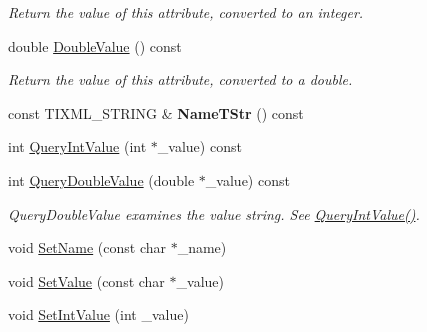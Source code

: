 \begin{DoxyCompactItemize}
\begin{DoxyCompactList}\small\item\em \-Return the value of this attribute, converted to an integer. \end{DoxyCompactList}\item 
\hypertarget{class_ti_xml_attribute_a2880ddef53fc7522c99535273954d230}{
double \hyperlink{class_ti_xml_attribute_a2880ddef53fc7522c99535273954d230}{\-Double\-Value} () const }
\label{class_ti_xml_attribute_a2880ddef53fc7522c99535273954d230}

\begin{DoxyCompactList}\small\item\em \-Return the value of this attribute, converted to a double. \end{DoxyCompactList}\item 
\hypertarget{class_ti_xml_attribute_a64cee17bceb8232eb0736d26dd082d79}{
const \-T\-I\-X\-M\-L\-\_\-\-S\-T\-R\-I\-N\-G \& {\bfseries \-Name\-T\-Str} () const }
\label{class_ti_xml_attribute_a64cee17bceb8232eb0736d26dd082d79}

\item 
int \hyperlink{class_ti_xml_attribute_ad6c93088ee21af41a107931223339344}{\-Query\-Int\-Value} (int $\ast$\-\_\-value) const 
\item 
\hypertarget{class_ti_xml_attribute_ac87b2a8489906a5d7aa2875f20be3513}{
int \hyperlink{class_ti_xml_attribute_ac87b2a8489906a5d7aa2875f20be3513}{\-Query\-Double\-Value} (double $\ast$\-\_\-value) const }
\label{class_ti_xml_attribute_ac87b2a8489906a5d7aa2875f20be3513}

\begin{DoxyCompactList}\small\item\em \-Query\-Double\-Value examines the value string. \-See \hyperlink{class_ti_xml_attribute_ad6c93088ee21af41a107931223339344}{\-Query\-Int\-Value()}. \end{DoxyCompactList}\item 
void \hyperlink{class_ti_xml_attribute_ab7fa3d21ff8d7c5764cf9af15b667a99}{\-Set\-Name} (const char $\ast$\-\_\-name)
\item 
void \hyperlink{class_ti_xml_attribute_a2dae44178f668b3cb48101be4f2236a0}{\-Set\-Value} (const char $\ast$\-\_\-value)
\item 
\hypertarget{class_ti_xml_attribute_a7e065df640116a62ea4f4b7da5449cc8}{
void \hyperlink{class_ti_xml_attribute_a7e065df640116a62ea4f4b7da5449cc8}{\-Set\-Int\-Value} (int \-\_\-value)}
\label{class_ti_xml_attribute_a7e065df640116a62ea4f4b7da5449cc8}


\end{DoxyCompactItemize}
